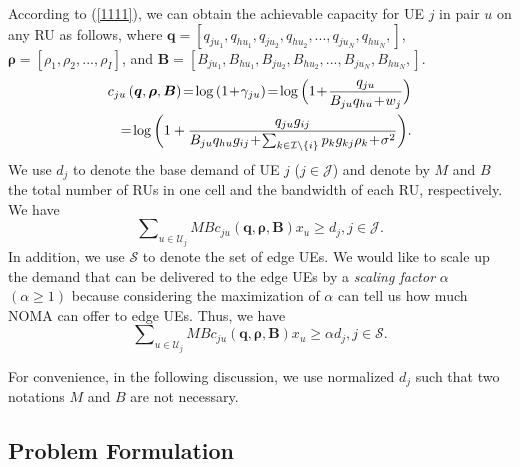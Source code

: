 \documentclass[10pt,journal,final,finalsubmission,twocolumn]{IEEEtran}
\begin{document}
According to (\ref{1111}), we can obtain the achievable capacity for UE $j$ in pair $u$ on any RU as follows, where $\boldsymbol{q}=[q_{ju_1},q_{hu_1},q_{ju_2},q_{hu_2},...,q_{ju_N},q_{hu_N},]$, $\boldsymbol{\rho}=[\rho_1,\rho_2,..., \rho_I]$, and $\boldsymbol{B}=[B_{ju_1},B_{hu_1},B_{ju_2},B_{hu_2},...,B_{ju_N},B_{hu_N},]$.
\begin{align}
c_{ju}\left (\boldsymbol{q},\boldsymbol{ \rho}, \boldsymbol{B}\right )\!=\!\log \left ( 1\!+\!\gamma_{ju} \right )\!=\!\log \Big ( 1\!+\!\frac{q_{ju}}{B_{ju}q_{hu}\!+\!w_j} \Big )\notag\\
=\!\log \bigg ( 1+\frac{q_{ju}g_{ij}}{{B_{ju}q_{hu}g_{ij}}\!+\!{\sum_{k\in \mathcal{I}\setminus \left \{ i \right \}}p_kg_{kj}\rho_k}\!+\!\sigma ^2} \bigg ).
\end{align}
We use $d_j$ to denote the base demand of UE $j$ ($j \in \mathcal{J}$) and denote by $M$ and $B$ the total number of RUs in one cell and the bandwidth of each RU, respectively. We have
\begin{equation}
\sum\nolimits_{u\in {\mathcal{U}}_j} M B c_{ju}\left (\boldsymbol{q},\boldsymbol{ \rho}, \boldsymbol{B}\right )x_u\geq d_j, j \in \mathcal{J}.
\end{equation}
In addition, we use $\mathcal{S}$ to denote the set of edge UEs. We would like to scale up the demand that can be delivered to the edge UEs by a {\em scaling factor} $\alpha$ $\left (\alpha \geq 1\right)$ because considering the maximization of $\alpha$ can tell us how much NOMA can offer to edge UEs. Thus, we have
\begin{equation}
\sum\nolimits_{u\in {\mathcal{U}}_j} M B c_{ju}\left (\boldsymbol{q},\boldsymbol{ \rho}, \boldsymbol{B}\right )x_u\geq \alpha d_j,j\in \mathcal{S}.
\end{equation}

For convenience, in the following discussion, we use normalized $d_j$ such that two notations $M$ and $B$ are not necessary.

\subsection{Problem Formulation}\label{MathematicalFormulation}
\end{document}
